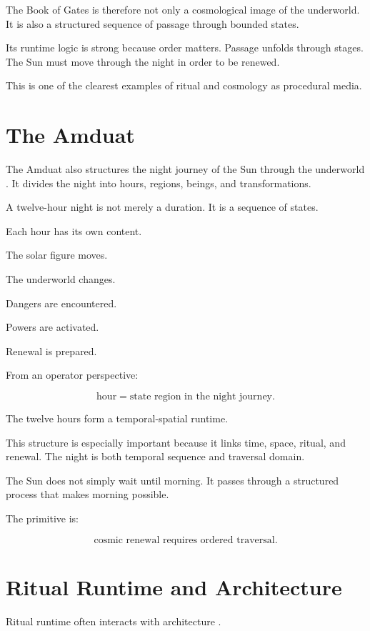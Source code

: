 \documentclass[11pt]{book}
\begin{document}
The Book of Gates is therefore not only a cosmological image of the underworld. It is also a structured sequence of passage through bounded states.

Its runtime logic is strong because order matters. Passage unfolds through stages. The Sun must move through the night in order to be renewed.

This is one of the clearest examples of ritual and cosmology as procedural media.

\section{The Amduat}

The Amduat also structures the night journey of the Sun through the underworld \cite{Hornung1999BooksAfterlife,Assmann2005DeathSalvation}. It divides the night into hours, regions, beings, and transformations.

A twelve-hour night is not merely a duration. It is a sequence of states.

Each hour has its own content.

The solar figure moves.

The underworld changes.

Dangers are encountered.

Powers are activated.

Renewal is prepared.

From an operator perspective:

\[
\text{hour} = \text{state region in the night journey}.
\]

The twelve hours form a temporal-spatial runtime.

This structure is especially important because it links time, space, ritual, and renewal. The night is both temporal sequence and traversal domain.

The Sun does not simply wait until morning. It passes through a structured process that makes morning possible.

The primitive is:

\[
\text{cosmic renewal requires ordered traversal}.
\]

\section{Ritual Runtime and Architecture}

Ritual runtime often interacts with architecture \cite{Assmann2005DeathSalvation,Hornung1999BooksAfterlife,Ruggles2005AncientAstronomy}.
\end{document}
